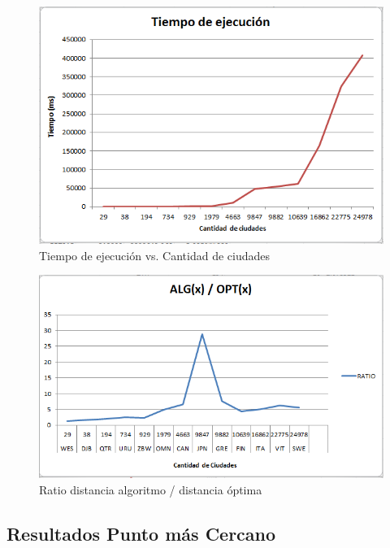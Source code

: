 \documentclass[12pt,letterpaper, margin = 3cm]{article}
\begin{document}
 \begin{figure}[ht!]
 \centering
 \includegraphics[scale=0.8]{img/timeconvexH.png}
 \caption{Tiempo de ejecución vs. Cantidad de ciudades}
 \end{figure}
 \begin{figure}[ht!]
 \centering
 \includegraphics[scale=0.8]{img/ratioconvexH.png}
 \caption{Ratio distancia algoritmo / distancia óptima}
 \end{figure}

\newpage 
\subsection{Resultados Punto más Cercano}
\end{document}
